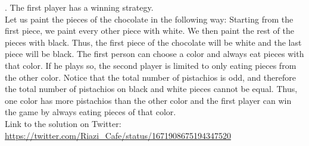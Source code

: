 \begin{solution}.
The first player has a winning strategy. \\[0.2cm]
Let us paint the pieces of the chocolate in the following way: Starting from the first piece, we paint every other piece with white. We then paint the rest of the pieces with black. Thus, the first piece of the chocolate will be white and the last piece will be black. The first person can choose a color and always eat pieces with that color. If he plays so, the second player is limited to only eating pieces from the other color.  Notice that the total number of pistachios is odd, and therefore the total number of pistachios on black and white pieces cannot be equal. Thus, one color has more pistachios than the other color and the first player can win the game by always eating pieces of that color.\\[0.2cm]

Link to the solution on Twitter:  \url{https://twitter.com/Riazi_Cafe/status/1671908675194347520}\end{solution}
